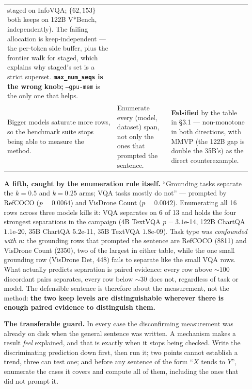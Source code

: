 \documentclass[10pt]{article}
\newcommand{\hh}[1]{\textbf{#1}}
\begin{document}
\begin{table}[h]
\begin{tabular}{p{}p{}p{}}
staged on InfoVQA; $\{62,153\}$ both keeps on 122B V*Bench, independently). The failing allocation
is keep-independent --- the per-token side buffer, plus the frontier walk for staged, which
explains why staged's set is a strict superset. \hh{\texttt{max\_num\_seqs} is the wrong knob;}
\texttt{--gpu-mem} is the only one that helps. \\
\addlinespace
Bigger models saturate more rows, so the benchmark suite stops being able to measure the method. &
Enumerate every (model, dataset) span, not only the ones that prompted the sentence. &
\hh{Falsified} by the table in \S3.1 --- non-monotone in both directions, with MMVP (the 122B gap
is double the 35B's) as the direct counterexample. \\
\bottomrule
\end{tabular}
\end{table}

\noindent\textbf{A fifth, caught by the enumeration rule itself.} ``Grounding tasks separate the
$k{=}0.5$ and $k{=}0.25$ arms; VQA tasks mostly do not'' --- prompted by RefCOCO ($p{=}0.0064$) and
VisDrone Count ($p{=}0.0042$). Enumerating all 16 rows across three models kills it: VQA separates
on 6 of 13 and holds the four strongest separations in the campaign (4B TextVQA $p{=}3.1$e-14, 122B
ChartQA $1.1$e-20, 35B ChartQA $5.2$e-11, 35B TextVQA $1.8$e-09). Task type was \emph{confounded
with $n$}: the grounding rows that prompted the sentence are RefCOCO (8811) and VisDrone Count
(2350), two of the largest in either table, while the one small grounding row (VisDrone Det, 448)
fails to separate like the small VQA rows. What actually predicts separation is paired evidence:
every row above ${\sim}100$ discordant pairs separates, every row below ${\sim}30$ does not,
regardless of task or model. The defensible sentence is therefore about the measurement, not the
method: \hh{the two keep levels are distinguishable wherever there is enough paired evidence to
distinguish them.}

\medskip
\noindent\textbf{The transferable guard.} In every case the disconfirming measurement was already
on disk when the general sentence was written. A mechanism makes a result \emph{feel} explained,
and that is exactly when it stops being checked. Write the discriminating prediction down first,
then run it; two points cannot establish a trend, three can test one; and before any sentence of
the form ``$X$ tends to $Y$'', enumerate the cases it covers and compute all of them, including the
ones that did not prompt it.
\end{document}
